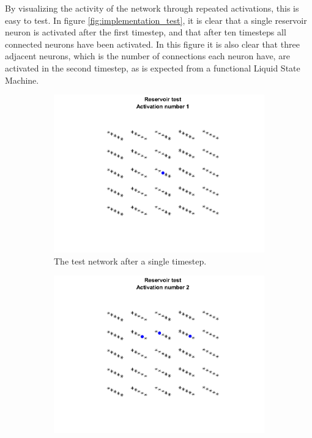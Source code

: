 By visualizing the activity of the network through repeated activations, this is easy to test. In figure \ref{fig:implementation_test}, it is clear that a single reservoir neuron is activated after the first timestep, and that after ten timesteps all connected neurons have been activated. In this figure it is also clear that three adjacent neurons, which is the number of connections each neuron have, are activated in the second timestep, as is expected from a functional Liquid State Machine.

\begin{figure}
    \centering
    \begin{subfigure}[b]{0.225\textwidth}
        \includegraphics[width=\textwidth]{Images/Reservoir_test_Activation_number_1.png}
        \caption{The test network after a single timestep.}
    \end{subfigure}
    \begin{subfigure}[b]{0.225\textwidth}
        \includegraphics[width=\textwidth]{Images/Reservoir_test_Activation_number_2.png}

\end{subfigure}
\end{figure}
